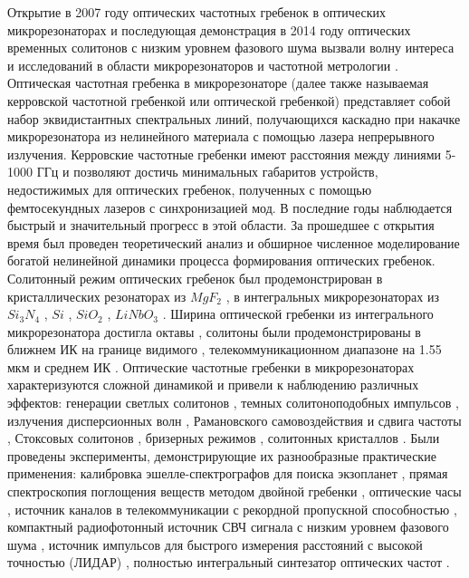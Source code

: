 
{\actuality} Открытие в 2007 году оптических частотных гребенок в оптических микрорезонаторах \cite{DelHaye2007} и последующая демонстрация в 2014 году оптических временных солитонов \cite{Herr2014} с низким уровнем фазового шума вызвали волну интереса и исследований в области микрорезонаторов и частотной метрологии \cite{Kippenberg2011,Kippenbergeaan8083}. Оптическая частотная гребенка в микрорезонаторе (далее также называемая керровской частотной гребенкой или оптической гребенкой) представляет собой набор эквидистантных спектральных линий, получающихся каскадно при накачке микрорезонатора из нелинейного материала с помощью лазера непрерывного излучения. Керровские частотные гребенки имеют расстояния между линиями 5-1000 ГГц и позволяют достичь минимальных габаритов устройств, недостижимых для оптических гребенок, полученных с помощью фемтосекундных лазеров с синхронизацией мод. В последние годы наблюдается быстрый и значительный прогресс в этой области. За прошедшее с открытия время был проведен теоретический анализ и обширное численное моделирование богатой нелинейной динамики процесса формирования оптических гребенок. Солитонный режим оптических гребенок был продемонстрирован в кристаллических резонаторах из $MgF_2$ \cite{Herr2014}, в интегральных микрорезонаторах из $Si_3N_4$ \cite{Brasch2016}, $Si$ \cite{Yu2016}, $SiO_2$ \cite{Yi2015}, $LiNbO_3$ \cite{2018arXiv181209610H}. Ширина оптической гребенки из интегрального микрорезонатора достигла октавы \cite{Pfeiffer:17}, солитоны были продемонстрированы в ближнем ИК на границе видимого \cite{Karpov2018}, телекоммуникационном диапазоне на 1.55 мкм \cite{Herr2014} и среднем ИК \cite{Griffith2016}. Оптические частотные гребенки в микрорезонаторах характеризуются сложной динамикой и привели к наблюдению различных эффектов: генерации светлых солитонов \cite{Herr2014}, темных солитоноподобных импульсов \cite{Xue2015}, излучения дисперсионных волн \cite{Brasch2016}, Рамановского самовоздействия и сдвига частоты \cite{Karpov2016}, Стоксовых солитонов \cite{Yang2016stokes}, бризерных режимов \cite{Lucas2017breather}, солитонных кристаллов \cite{Cole2017crystals}. Были проведены эксперименты, демонстрирующие их разнообразные практические применения: калибровка эшелле-спектрографов для поиска экзопланет \cite{Obrzud2019}, прямая спектроскопия поглощения веществ методом двойной гребенки \cite{Suh2016}, оптические часы \cite{Papp2014}, источник каналов в телекоммуникации с рекордной пропускной способностью \cite{MarinPalomo2017}, компактный радиофотонный источник СВЧ сигнала с низким уровнем фазового шума \cite{Liang2015}, источник импульсов для быстрого измерения расстояний с высокой точностью (ЛИДАР) \cite{Trocha887}, полностью интегральный синтезатор оптических частот \cite{Spencer2018}.


